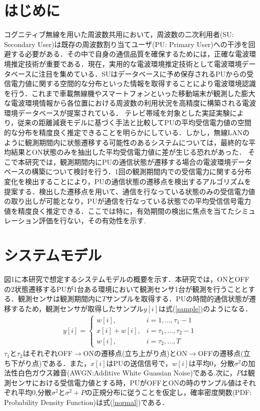 \documentclass[10pt, twocolumn, a4j]{jsarticle}
\begin{document}
\section{はじめに}
コグニティブ無線\cite{Haykin}を用いた周波数共用において，周波数の二次利用者(SU: Secondary User)は既存の周波数割り当てユーザ(PU: Primary User)への干渉を回避する必要がある．その中で自身の通信品質を確保するためには，正確な電波環境推定技術が重要である．現在，実用的な電波環境推定技術として電波環境データベースに注目を集めている．SUはデータベースに予め保存されるPUからの受信電力値に関する空間的な分布といった情報を取得することにより電波環境認識を行う．これまで車載無線機やスマートフォンといった移動端末が観測した膨大な電波環境情報から各位置における周波数の利用状況を高精度に構築される電波環境データベースが提案されている\cite{DB}．
テレビ帯域を対象とした実証実験により，従来の距離減衰モデルに基づく手法と比較してPUの平均受信電力値の空間的な分布を精度良く推定できることを明らかにしている．しかし，無線LANのように観測期間内に状態遷移する可能性のあるシステムについては，最終的な平均結果とON状態のみを抽出した平均受信電力値に差が生じる恐れがあった．
そこで本研究では，観測期間内にPUの通信状態が遷移する場合の電波環境データベースの構築について検討を行う．1回の観測期間内での受信電力に関する分布変化を検出することにより，PUの通信状態の遷移点を検出するアルゴリズムを提案する．検出した遷移点を用いて、通信を行なっている状態のみの受信電力値の取り出しが可能となり，PUが通信を行なっている状態での平均受信信号電力値を精度良く推定できる．ここでは特に，有効期間の検出に焦点を当てたシミュレーション評価を行ない，その有効性を示す.
\section{システムモデル}
図1に本研究で想定するシステムモデルの概要を示す．本研究では，ONとOFFの2状態遷移するPUが1台ある環境において観測センサ1台が観測を行うこととする．観測センサは観測期間内に$T$サンプルを取得する．PUの時間的通信状態が遷移するため，観測センサが取得したサンプル$y[i]$は式(\ref{sample})のようになる．
\begin{align}
y[i]=
\left\{
\begin{array}{ll}
w[i], & i=1,\dots,\tau_1-1 \\
x[i]+w[i],& i=\tau_1,\dots,\tau_2-1 \\
w[i],& i=\tau_2,\dots,T 
\end{array}
\right.
\label{sample}
\end{align}
$\tau_1$と$\tau_2$はそれぞれOFF$\rightarrow$ONの遷移点(立ち上がり点)とON$\rightarrow$OFFの遷移点(立ち下がり点)である．また，$x[i]$はPUの送信信号で，$w[i]$は平均0，分散$\sigma^{2}$の加法性白色ガウス雑音(AWGN:Additive White Guassian Noise)である.次に，$P$は観測センサにおける受信電力値とする時，PUがOFFとONの時のサンプル値はそれぞれ平均0,分散$\sigma^2$と$\sigma^2+P$の正規分布に従うことを仮定し，確率密度関数(PDF: Probability Density Function)は式(\ref{normal})である．
\end{document}
